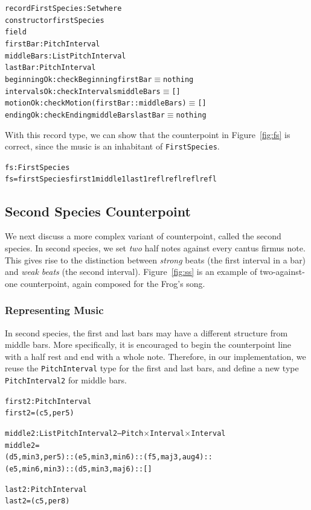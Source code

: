 \begin{alltt}
record FirstSpecies : Set where
  constructor firstSpecies
  field
    firstBar    : PitchInterval
    middleBars  : List PitchInterval
    lastBar     : PitchInterval
    beginningOk : checkBeginning firstBar \(\equiv\) nothing
    intervalsOk : checkIntervals middleBars \(\equiv\) []
    motionOk    : checkMotion (firstBar :: middleBars) \(\equiv\) []
    endingOk    : checkEnding middleBars lastBar \(\equiv\) nothing
\end{alltt}

With this record type, we can show that the counterpoint in
Figure~\ref{fig:fs} is correct, since the music is an inhabitant of
\texttt{FirstSpecies}.

\begin{alltt}
fs : FirstSpecies
fs = firstSpecies first1 middle1 last1 refl refl refl refl
\end{alltt}

\subsection{Second Species Counterpoint}
\label{sec:cp:ss}

\SS

We next discuss a more complex variant of counterpoint, called the
second species.
In second species, we set \emph{two} half notes against every cantus
firmus note.
This gives rise to the distinction between \emph{strong} beats (the
first interval in a bar) and \emph{weak beats} (the second interval).
Figure~\ref{fig:ss} is an example of two-against-one counterpoint,
again composed for the Frog's song.

\subsubsection{Representing Music}

In second species, the first and last bars may have a different structure
from middle bars.
More specifically, it is encouraged to begin the counterpoint line with
a half rest and end with a whole note.
Therefore, in our implementation, we reuse the \texttt{PitchInterval} 
type for the first and last bars, and define a new type
\texttt{PitchInterval2} for middle bars.

\begin{alltt}
first2 : PitchInterval
first2 = (c 5 , per5)

middle2 : List PitchInterval2 -- Pitch \(\times\) Interval \(\times\) Interval
middle2 =
  (d 5 , min3 , per5) :: (e 5 , min3 , min6) :: (f 5 , maj3 , aug4) ::
  (e 5 , min6 , min3) :: (d 5 , min3 , maj6) :: []

last2 : PitchInterval
last2 = (c 5 , per8)
\end{alltt}

